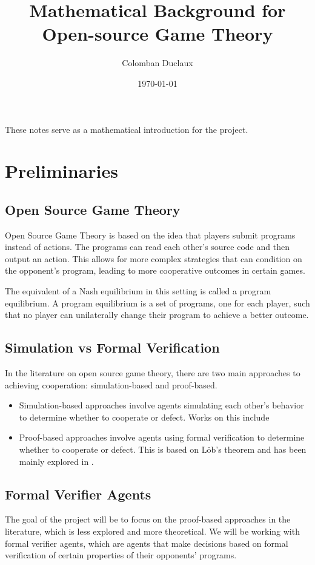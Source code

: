 \documentclass{article}
\title{Mathematical Background for Open-source Game Theory}
\author{Colomban Duclaux}
\date{\today}
\begin{document}
\maketitle

These notes serve as a mathematical introduction for the project.

\section{Preliminaries}
\subsection{Open Source Game Theory}
Open Source Game Theory is based on the idea that players submit programs instead of actions. The programs can read each other's source code and then output an action. This allows for more complex strategies that can condition on the opponent's program, leading to more cooperative outcomes in certain games.

The equivalent of a Nash equilibrium in this setting is called a program equilibrium. A program equilibrium is a set of programs, one for each player, such that no player can unilaterally change their program to achieve a better outcome.

\subsection{Simulation vs Formal Verification}
In the literature on open source game theory, there are two main approaches to achieving cooperation: simulation-based and proof-based.
\begin{itemize}
    \item Simulation-based approaches involve agents simulating each other's behavior to determine whether to cooperate or defect. Works on this include \cite{robust_program_equilibrium,caspar_oesterheld_program_equilibrium,cooper2025characterisingsimulationbasedprogramequilibria}
    \item Proof-based approaches involve agents using formal verification to determine whether to cooperate or defect. This is based on Löb's theorem and has been mainly explored in \cite{critch2022cooperativeuncooperativeinstitutiondesigns}.
\end{itemize}

\subsection{Formal Verifier Agents}
The goal of the project will be to focus on the proof-based approaches in the literature, which is less explored and more theoretical. We will be working with formal verifier agents, which are agents that make decisions based on formal verification of certain properties of their opponents' programs.
\end{document}

